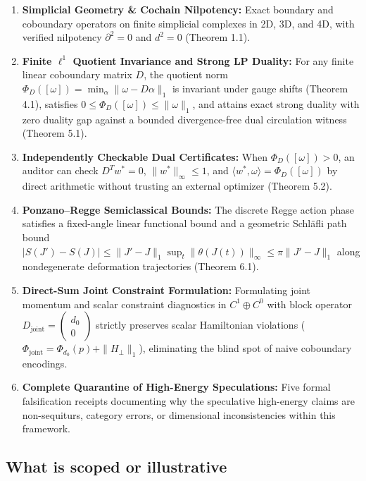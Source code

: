 \documentclass[11pt]{article}
\begin{document}
\begin{enumerate}[leftmargin=1.4em,itemsep=0.2em]
\item \textbf{Simplicial Geometry \& Cochain Nilpotency:} Exact boundary and coboundary operators on finite simplicial complexes in 2D, 3D, and 4D, with verified nilpotency $\partial^2 = 0$ and $d^2 = 0$ (Theorem 1.1).
\item \textbf{Finite $\ell^1$ Quotient Invariance and Strong LP Duality:} For any finite linear coboundary matrix $D$, the quotient norm $\Phi_D([\omega]) = \min_\alpha \|\omega - D\alpha\|_1$ is invariant under gauge shifts (Theorem 4.1), satisfies $0 \le \Phi_D([\omega]) \le \|\omega\|_1$, and attains exact strong duality with zero duality gap against a bounded divergence-free dual circulation witness (Theorem 5.1).
\item \textbf{Independently Checkable Dual Certificates:} When $\Phi_D([\omega]) > 0$, an auditor can check $D^T w^* = 0$, $\|w^*\|_\infty \le 1$, and $\langle w^*, \omega \rangle = \Phi_D([\omega])$ by direct arithmetic without trusting an external optimizer (Theorem 5.2).
\item \textbf{Ponzano--Regge Semiclassical Bounds:} The discrete Regge action phase satisfies a fixed-angle linear functional bound and a geometric Schläfli path bound $|S(J') - S(J)| \le \|J' - J\|_1 \sup_{t} \|\theta(J(t))\|_\infty \le \pi \|J' - J\|_1$ along nondegenerate deformation trajectories (Theorem 6.1).
\item \textbf{Direct-Sum Joint Constraint Formulation:} Formulating joint momentum and scalar constraint diagnostics in $C^1 \oplus C^0$ with block operator $D_{\mathrm{joint}} = \begin{pmatrix} d_0 \\ 0 \end{pmatrix}$ strictly preserves scalar Hamiltonian violations ($\Phi_{\mathrm{joint}} = \Phi_{d_0}(p) + \|H_\perp\|_1$), eliminating the blind spot of naive coboundary encodings.
\item \textbf{Complete Quarantine of High-Energy Speculations:} Five formal falsification receipts documenting why the speculative high-energy claims are non-sequiturs, category errors, or dimensional inconsistencies within this framework.
\end{enumerate}
\subsection{\texorpdfstring{What is scoped or illustrative}{What is scoped or illustrative}}
\end{document}
